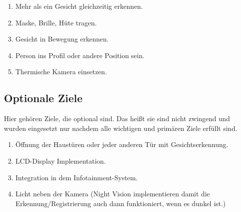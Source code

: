 \begin{enumerate}
	\item Mehr als ein Gesicht gleichzeitig erkennen.
	
	\item Maske, Brille, Hüte tragen.
	
	\item Gesicht in Bewegung erkennen.
	
	\item Person ins Profil oder andere Position sein.
	
	\item Thermische Kamera einsetzen.
	
	
\end{enumerate}
\subsection{Optionale Ziele}
Hier gehören Ziele, die optional sind. Das heißt sie sind nicht zwingend und wurden eingesetzt nur nachdem alle wichtigen und primären Ziele erfüllt sind.

\begin{enumerate}
	
	
	\item Öffnung der Haustüren oder jeder anderen Tür mit Gesichtserkennung.
	
	\item LCD-Display Implementation.
	
	\item Integration in dem Infotainment-System.
	
	\item Licht neben der Kamera (Night Vision implementieren damit die Erkennung/Registrierung auch dann funktioniert, wenn es dunkel ist.)
\end{enumerate}

